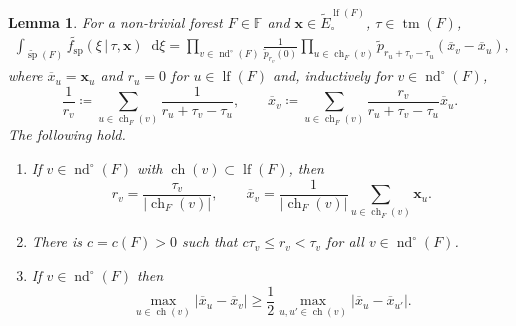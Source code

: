 \documentclass[reqno,draft]{amsart}
\numberwithin{equation}{section}
\theoremstyle{plain}
\newtheorem{lemma}[theorem]{Lemma}
\theoremstyle{remark}
\newcommand*\diff{\mathop{}\!\mathrm{d}}
\DeclareMathOperator{\ch}{ch}
\DeclareMathOperator{\lf}{lf}
\DeclareMathOperator{\nd}{nd}
\DeclareMathOperator{\dct}{tm}
\DeclareMathOperator{\dcs}{sp}
\newcommand{\rfy}[1]{\widetilde{{#1}}} %
\newcommand{\fsp}{f_\mathrm{sp}}
\newcommand{\interp}{\overline{x}} %
\begin{document}
\begin{lemma}\label{lem:NFaux}
    For a non-trivial forest $F\in \mathbb{F}$ and $\boldsymbol x \in \rfy{E}^{\lf(F)}_\circ $, $\tau \in \dct(F)$,
    \begin{align}\label{eq:NFaux}
        \int_{\rfy{\dcs}(F)} \rfy{\fsp}(\xi \,\vert\,\tau,\boldsymbol x) \diff \xi = \prod_{v\in \nd^\circ (F)} \frac{1}{\rfy{p}_{r_v}(0)} \prod_{u\in \ch_F(v)} \rfy{p}_{r_u + \tau_v - \tau_u} (\interp_v -\interp_u),
    \end{align}
    where $\interp_u = \boldsymbol x_u$ and $r_u = 0$ for $u\in \lf(F)$ and, inductively for $v\in \nd^\circ (F)$, \[
        \frac{1}{r_v} \coloneqq \sum_{u\in \ch_F(v)} \frac{1}{r_u+\tau_v - \tau_u},\qquad \interp_v \coloneqq \sum_{u\in \ch_F(v)} \frac{r_v}{r_u+\tau_v - \tau_u} \interp_u.
    \] The following hold.
    \begin{enumerate}
        \item If $v\in \nd^\circ (F)$ with $\ch(v) \subset \lf(F)$, then \[
                r_v = \frac{\tau_v}{|\ch_F(v)|},\qquad \interp_v = \frac{1}{|\ch_F(v)|} \sum_{u\in \ch_F(v)} \boldsymbol x_u.
        \]
        \item There is $c = c(F) > 0$ such that $c \tau_v \le r_v < \tau_v$ for all $v\in \nd^\circ (F)$.
        \item If $v\in \nd^\circ (F)$ then \[
                \max_{u\in \ch(v)} |\interp_u-\interp_v| \ge \frac{1}{2}\max_{u,u'\in \ch(v)}|\interp_u-\interp_{u'}|.
        \]
    \end{enumerate}
\end{lemma}
\end{document}
